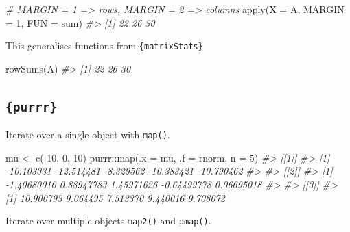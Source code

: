\documentclass[
  12pt,
]{book}
\newenvironment{Shaded}{\begin{snugshade}}{\end{snugshade}}
\newcommand{\AttributeTok}[1]{\textcolor[rgb]{0.77,0.63,0.00}{#1}}
\newcommand{\CommentTok}[1]{\textcolor[rgb]{0.56,0.35,0.01}{\textit{#1}}}
\newcommand{\DecValTok}[1]{\textcolor[rgb]{0.00,0.00,0.81}{#1}}
\newcommand{\FunctionTok}[1]{\textcolor[rgb]{0.00,0.00,0.00}{#1}}
\newcommand{\NormalTok}[1]{#1}
\newcommand{\OtherTok}[1]{\textcolor[rgb]{0.56,0.35,0.01}{#1}}
\newcommand{\SpecialCharTok}[1]{\textcolor[rgb]{0.00,0.00,0.00}{#1}}
\begin{document}
\begin{Shaded}
\begin{Highlighting}[]
\CommentTok{\# MARGIN = 1 =\textgreater{} rows,  MARGIN = 2 =\textgreater{} columns}
\FunctionTok{apply}\NormalTok{(}\AttributeTok{X =}\NormalTok{ A, }\AttributeTok{MARGIN =} \DecValTok{1}\NormalTok{, }\AttributeTok{FUN =}\NormalTok{ sum)}
\CommentTok{\#\textgreater{} [1] 22 26 30}
\end{Highlighting}
\end{Shaded}

This generalises functions from \texttt{\{matrixStats\}}

\begin{Shaded}
\begin{Highlighting}[]
\FunctionTok{rowSums}\NormalTok{(A)}
\CommentTok{\#\textgreater{} [1] 22 26 30}
\end{Highlighting}
\end{Shaded}

\hypertarget{purrr}{%
\subsection{\texorpdfstring{\texttt{\{purrr\}}}{\{purrr\}}}\label{purrr}}

Iterate over a single object with \texttt{map()}.

\begin{Shaded}
\begin{Highlighting}[]
\NormalTok{mu }\OtherTok{\textless{}{-}} \FunctionTok{c}\NormalTok{(}\SpecialCharTok{{-}}\DecValTok{10}\NormalTok{, }\DecValTok{0}\NormalTok{, }\DecValTok{10}\NormalTok{)}
\NormalTok{purrr}\SpecialCharTok{::}\FunctionTok{map}\NormalTok{(}\AttributeTok{.x =}\NormalTok{ mu, }\AttributeTok{.f =}\NormalTok{ rnorm, }\AttributeTok{n =} \DecValTok{5}\NormalTok{)}
\CommentTok{\#\textgreater{} [[1]]}
\CommentTok{\#\textgreater{} [1] {-}10.103031 {-}12.514481  {-}8.329562 {-}10.383421 {-}10.790462}
\CommentTok{\#\textgreater{} }
\CommentTok{\#\textgreater{} [[2]]}
\CommentTok{\#\textgreater{} [1] {-}1.40680010  0.88947783  1.45971626 {-}0.64499778  0.06695018}
\CommentTok{\#\textgreater{} }
\CommentTok{\#\textgreater{} [[3]]}
\CommentTok{\#\textgreater{} [1] 10.900793  9.064495  7.513370  9.440016  9.708072}
\end{Highlighting}
\end{Shaded}

Iterate over multiple objects \texttt{map2()} and \texttt{pmap()}.
\end{document}
